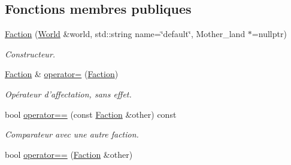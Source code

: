 \subsection*{Fonctions membres publiques}
\begin{DoxyCompactItemize}
\item 
\hyperlink{classFaction_a470f14f0b1d94261d427a4673fe92421}{Faction} (\hyperlink{classWorld}{World} \&world, std\-::string name=\char`\"{}default\char`\"{}, Mother\-\_\-land $\ast$=nullptr)
\begin{DoxyCompactList}\small\item\em Constructeur. \end{DoxyCompactList}\item 
\hypertarget{classFaction_add5275f09ab0dd9a43dc7aa6e04e6e8a}{\hyperlink{classFaction}{Faction} \& \hyperlink{classFaction_add5275f09ab0dd9a43dc7aa6e04e6e8a}{operator=} (\hyperlink{classFaction}{Faction})}\label{classFaction_add5275f09ab0dd9a43dc7aa6e04e6e8a}

\begin{DoxyCompactList}\small\item\em Opérateur d'affectation, sans effet. \end{DoxyCompactList}\item 
\hypertarget{classFaction_a92285ba431e78a6fccb7ef1a9283dd65}{bool \hyperlink{classFaction_a92285ba431e78a6fccb7ef1a9283dd65}{operator==} (const \hyperlink{classFaction}{Faction} \&other) const }\label{classFaction_a92285ba431e78a6fccb7ef1a9283dd65}

\begin{DoxyCompactList}\small\item\em Comparateur avec une autre faction. \end{DoxyCompactList}\item 
\hypertarget{classFaction_adce9c9ccf9fe8a20a2680dd918a59a28}{bool \hyperlink{classFaction_adce9c9ccf9fe8a20a2680dd918a59a28}{operator==} (\hyperlink{classFaction}{Faction} \&other)}\label{classFaction_adce9c9ccf9fe8a20a2680dd918a59a28}


\end{DoxyCompactItemize}
